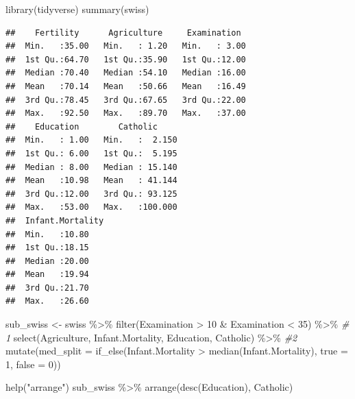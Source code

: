 \documentclass[
]{book}
\newenvironment{Shaded}{\begin{snugshade}}{\end{snugshade}}
\newcommand{\AttributeTok}[1]{\textcolor[rgb]{0.77,0.63,0.00}{#1}}
\newcommand{\CommentTok}[1]{\textcolor[rgb]{0.56,0.35,0.01}{\textit{#1}}}
\newcommand{\DecValTok}[1]{\textcolor[rgb]{0.00,0.00,0.81}{#1}}
\newcommand{\FunctionTok}[1]{\textcolor[rgb]{0.00,0.00,0.00}{#1}}
\newcommand{\NormalTok}[1]{#1}
\newcommand{\OtherTok}[1]{\textcolor[rgb]{0.56,0.35,0.01}{#1}}
\newcommand{\SpecialCharTok}[1]{\textcolor[rgb]{0.00,0.00,0.00}{#1}}
\newcommand{\StringTok}[1]{\textcolor[rgb]{0.31,0.60,0.02}{#1}}
\begin{document}
\hypertarget{solution1}{}
\begin{Shaded}
\begin{Highlighting}[]
\FunctionTok{library}\NormalTok{(tidyverse)}
\FunctionTok{summary}\NormalTok{(swiss)}
\end{Highlighting}
\end{Shaded}

\begin{verbatim}
##    Fertility      Agriculture     Examination   
##  Min.   :35.00   Min.   : 1.20   Min.   : 3.00  
##  1st Qu.:64.70   1st Qu.:35.90   1st Qu.:12.00  
##  Median :70.40   Median :54.10   Median :16.00  
##  Mean   :70.14   Mean   :50.66   Mean   :16.49  
##  3rd Qu.:78.45   3rd Qu.:67.65   3rd Qu.:22.00  
##  Max.   :92.50   Max.   :89.70   Max.   :37.00  
##    Education        Catholic      
##  Min.   : 1.00   Min.   :  2.150  
##  1st Qu.: 6.00   1st Qu.:  5.195  
##  Median : 8.00   Median : 15.140  
##  Mean   :10.98   Mean   : 41.144  
##  3rd Qu.:12.00   3rd Qu.: 93.125  
##  Max.   :53.00   Max.   :100.000  
##  Infant.Mortality
##  Min.   :10.80   
##  1st Qu.:18.15   
##  Median :20.00   
##  Mean   :19.94   
##  3rd Qu.:21.70   
##  Max.   :26.60
\end{verbatim}

\begin{Shaded}
\begin{Highlighting}[]
\NormalTok{sub\_swiss }\OtherTok{\textless{}{-}}\NormalTok{ swiss }\SpecialCharTok{\%\textgreater{}\%} 
  \FunctionTok{filter}\NormalTok{(Examination }\SpecialCharTok{\textgreater{}} \DecValTok{10} \SpecialCharTok{\&}\NormalTok{ Examination }\SpecialCharTok{\textless{}} \DecValTok{35}\NormalTok{) }\SpecialCharTok{\%\textgreater{}\%}  \CommentTok{\# 1}
  \FunctionTok{select}\NormalTok{(Agriculture, Infant.Mortality, Education, Catholic) }\SpecialCharTok{\%\textgreater{}\%} \CommentTok{\#2}
  \FunctionTok{mutate}\NormalTok{(}\AttributeTok{med\_split =} \FunctionTok{if\_else}\NormalTok{(Infant.Mortality }\SpecialCharTok{\textgreater{}} \FunctionTok{median}\NormalTok{(Infant.Mortality),}
                             \AttributeTok{true =} \DecValTok{1}\NormalTok{,}
                             \AttributeTok{false =}  \DecValTok{0}\NormalTok{))}

\FunctionTok{help}\NormalTok{(}\StringTok{"arrange"}\NormalTok{)}
\NormalTok{sub\_swiss }\SpecialCharTok{\%\textgreater{}\%} 
  \FunctionTok{arrange}\NormalTok{(}\FunctionTok{desc}\NormalTok{(Education),}
\NormalTok{          Catholic)}
\end{Highlighting}
\end{Shaded}
\end{document}
